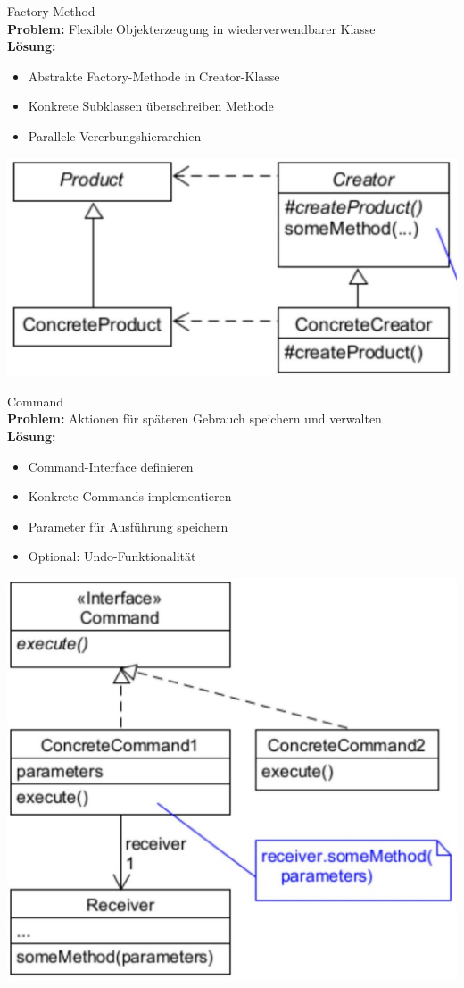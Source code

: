 \begin{concept}{Factory Method}\\
\textbf{Problem:} Flexible Objekterzeugung in wiederverwendbarer Klasse\\
\textbf{Lösung:}
\begin{itemize}
    \item Abstrakte Factory-Methode in Creator-Klasse
    \item Konkrete Subklassen überschreiben Methode
    \item Parallele Vererbungshierarchien
\end{itemize}
\includegraphics[width=0.8\linewidth]{images/2025_01_02_73d93f10fa91ab6123dcg-16}
\end{concept}

\begin{concept}{Command}\\
\textbf{Problem:} Aktionen für späteren Gebrauch speichern und verwalten\\
\textbf{Lösung:}
\begin{itemize}
    \item Command-Interface definieren
    \item Konkrete Commands implementieren
    \item Parameter für Ausführung speichern
    \item Optional: Undo-Funktionalität
\end{itemize}
\includegraphics[width=0.8\linewidth]{images/2025_01_02_73d93f10fa91ab6123dcg-19}
\end{concept}

